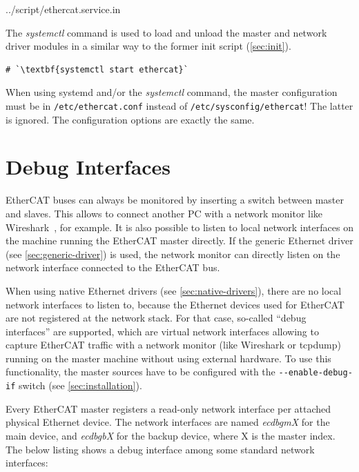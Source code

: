 \documentclass[a4paper,12pt,BCOR=6mm,bibtotoc,idxtotoc]{scrbook}
\begin{document}

    {../script/ethercat.service.in}

The \textit{systemctl} command is used to load and unload the master and
network driver modules in a similar way to the former init script
(\autoref{sec:init}).

\begin{lstlisting}[gobble=2]
  # `\textbf{systemctl start ethercat}`
\end{lstlisting}

When using systemd and/or the \textit{systemctl} command, the master
configuration must be in \texttt{/etc/ethercat.conf} instead of
\texttt{/etc/sysconfig/ethercat}! The latter is ignored. The configuration
options are exactly the same.


\section{Debug Interfaces}
\label{sec:debug}

EtherCAT buses can always be monitored by inserting a switch between master
and slaves. This allows to connect another PC with a network monitor like
Wireshark~\cite{wireshark}, for example. It is also possible to listen to
local network interfaces on the machine running the EtherCAT master directly.
If the generic Ethernet driver (see \autoref{sec:generic-driver}) is used,
the network monitor can directly listen on the network interface connected to
the EtherCAT bus.

When using native Ethernet drivers (see \autoref{sec:native-drivers}), there
are no local network interfaces to listen to, because the Ethernet devices
used for EtherCAT are not registered at the network stack. For that case,
so-called ``debug interfaces'' are supported, which are virtual network
interfaces allowing to capture EtherCAT traffic with a network monitor (like
Wireshark or tcpdump) running on the master machine without using external
hardware. To use this functionality, the master sources have to be configured
with the \lstinline+--enable-debug-if+ switch (see
\autoref{sec:installation}).

Every EtherCAT master registers a read-only network interface per attached
physical Ethernet device. The network interfaces are named \textit{ecdbgmX}
for the main device, and \textit{ecdbgbX} for the backup device, where X is
the master index. The below listing shows a debug interface among some
standard network interfaces:
\end{document}
